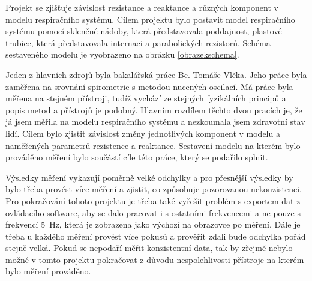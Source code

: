 Projekt se zjišťuje závislost rezistance a reaktance a různých komponent v modelu respiračního systému. 
Cílem projektu bylo postavit model respiračního systému pomocí skleněné nádoby, která představovala poddajnost, plastové trubice, která představovala internaci a parabolických rezistorů.  Schéma sestaveného modelu je vyobrazeno na obrázku \ref{obrazekschema}. 

Jeden z hlavních zdrojů byla bakalářská práce Bc. Tomáše Vlčka. Jeho práce byla zaměřena na srovnání spirometrie s metodou nucených oscilací. Má práce byla měřena na stejném přístroji, tudíž vychází ze stejných fyzikálních principů a popis metod a přístrojů je podobný. Hlavním rozdílem těchto dvou pracích je, že já jsem měřila na modelu respiračního systému a nezkoumala jsem zdravotní stav lidí. Cílem bylo zjistit závislost změny jednotlivých komponent v modelu a naměřených parametrů rezistence a reaktance. Sestavení modelu na kterém bylo prováděno měření bylo součástí cíle této práce, který se podařilo splnit. 

Výsledky měření vykazují poměrně velké odchylky a pro přesnější výsledky by bylo třeba provést více měření a zjistit, co způsobuje pozorovanou nekonzistenci. Pro pokračování tohoto projektu je třeba také vyřešit problém s exportem dat z ovládacího software, aby se dalo pracovat i s ostatními frekvencemi a ne pouze s frekvencí \SI{5}{Hz}, která je zobrazena jako výchozí na obrazovce po měření. Dále je třeba u každého měření provést více pokusů a prověřit zdali bude odchylka pořád stejně velká. 
Pokud se nepodaří měřit konzistentní data, tak by zřejmě nebylo možné v tomto projektu pokračovat z důvodu nespolehlivosti přístroje na kterém bylo měření prováděno. 
